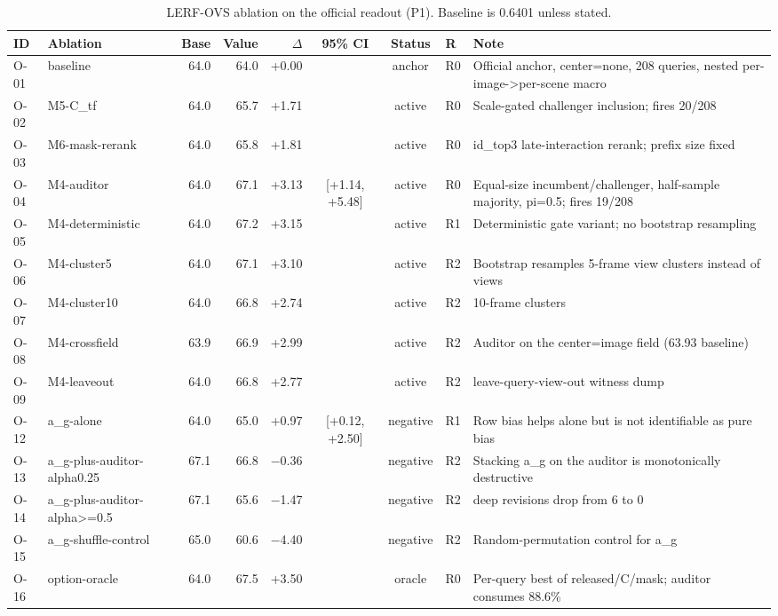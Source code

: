\begin{table}[t]
\centering
\small
\caption{LERF-OVS ablation on the official readout (P1). Baseline is 0.6401 unless stated.}
\label{tab:abl-lerf}
\begin{tabular}{llrrrcclp{5.2cm}}
\toprule
ID & Ablation & Base & Value & $\Delta$ & 95\% CI & Status & R & Note \\
\midrule
O-01 & baseline & 64.0 & 64.0 & +0.00 &  & anchor & R0 & Official anchor, center=none, 208 queries, nested per-image->per-scene macro \\
O-02 & M5-C\_tf & 64.0 & 65.7 & +1.71 &  & active & R0 & Scale-gated challenger inclusion; fires 20/208 \\
O-03 & M6-mask-rerank & 64.0 & 65.8 & +1.81 &  & active & R0 & id\_top3 late-interaction rerank; prefix size fixed \\
O-04 & M4-auditor & 64.0 & 67.1 & +3.13 & [+1.14, +5.48] & active & R0 & Equal-size incumbent/challenger, half-sample majority, pi=0.5; fires 19/208 \\
O-05 & M4-deterministic & 64.0 & 67.2 & +3.15 &  & active & R1 & Deterministic gate variant; no bootstrap resampling \\
O-06 & M4-cluster5 & 64.0 & 67.1 & +3.10 &  & active & R2 & Bootstrap resamples 5-frame view clusters instead of views \\
O-07 & M4-cluster10 & 64.0 & 66.8 & +2.74 &  & active & R2 & 10-frame clusters \\
O-08 & M4-crossfield & 63.9 & 66.9 & +2.99 &  & active & R2 & Auditor on the center=image field (63.93 baseline) \\
O-09 & M4-leaveout & 64.0 & 66.8 & +2.77 &  & active & R2 & leave-query-view-out witness dump \\
O-12 & a\_g-alone & 64.0 & 65.0 & +0.97 & [+0.12, +2.50] & negative & R1 & Row bias helps alone but is not identifiable as pure bias \\
O-13 & a\_g-plus-auditor-alpha0.25 & 67.1 & 66.8 & $-$0.36 &  & negative & R2 & Stacking a\_g on the auditor is monotonically destructive \\
O-14 & a\_g-plus-auditor-alpha>=0.5 & 67.1 & 65.6 & $-$1.47 &  & negative & R2 & deep revisions drop from 6 to 0 \\
O-15 & a\_g-shuffle-control & 65.0 & 60.6 & $-$4.40 &  & negative & R2 & Random-permutation control for a\_g \\
O-16 & option-oracle & 64.0 & 67.5 & +3.50 &  & oracle & R0 & Per-query best of released/C/mask; auditor consumes 88.6\% \\

\end{tabular}
\end{table}
